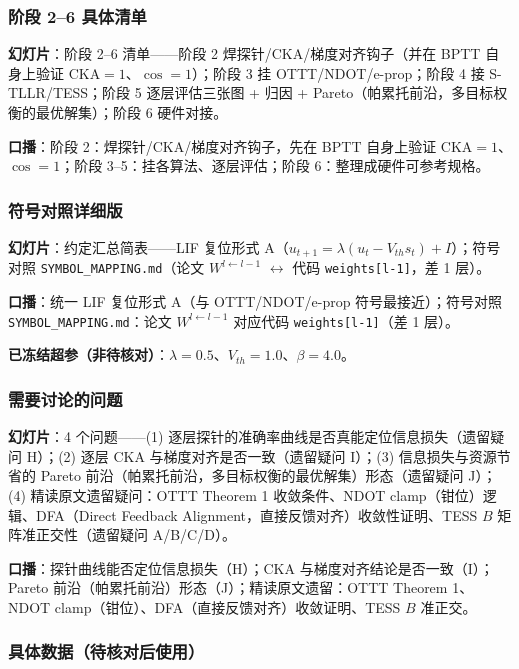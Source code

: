 \documentclass[journal,12pt,onecolumn]{IEEEtran}
\begin{document}
\subsubsection{阶段 2--6 具体清单}

\textbf{幻灯片}：阶段 2--6 清单——阶段 2 焊探针/CKA/梯度对齐钩子（并在 BPTT 自身上验证 $\mathrm{CKA}=1$、$\cos=1$）；阶段 3 挂 OTTT/NDOT/e-prop；阶段 4 接 S-TLLR/TESS；阶段 5 逐层评估三张图 + 归因 + Pareto（帕累托前沿，多目标权衡的最优解集）；阶段 6 硬件对接。

\textbf{口播}：阶段 2：焊探针/CKA/梯度对齐钩子，先在 BPTT 自身上验证 $\mathrm{CKA}=1$、$\cos=1$；阶段 3--5：挂各算法、逐层评估；阶段 6：整理成硬件可参考规格。

\subsubsection{符号对照详细版}

\textbf{幻灯片}：约定汇总简表——LIF 复位形式 A（$u_{t+1}=\lambda(u_t-V_{th}s_t)+I$）；符号对照 \texttt{SYMBOL\_MAPPING.md}（论文 $W^{l\leftarrow l-1}$ $\leftrightarrow$ 代码 \texttt{weights[l-1]}，差 1 层）。

\textbf{口播}：统一 LIF 复位形式 A（与 OTTT/NDOT/e-prop 符号最接近）；符号对照 \texttt{SYMBOL\_MAPPING.md}：论文 $W^{l\leftarrow l-1}$ 对应代码 \texttt{weights[l-1]}（差 1 层）。

\textbf{已冻结超参（非待核对）}：$\lambda=0.5$、$V_{th}=1.0$、$\beta=4.0$。

\subsubsection{需要讨论的问题}

\textbf{幻灯片}：4 个问题——(1) 逐层探针的准确率曲线是否真能定位信息损失（遗留疑问 H）；(2) 逐层 CKA 与梯度对齐是否一致（遗留疑问 I）；(3) 信息损失与资源节省的 Pareto 前沿（帕累托前沿，多目标权衡的最优解集）形态（遗留疑问 J）；(4) 精读原文遗留疑问：OTTT Theorem 1 收敛条件、NDOT clamp（钳位）逻辑、DFA（Direct Feedback Alignment，直接反馈对齐）收敛性证明、TESS $B$ 矩阵准正交性（遗留疑问 A/B/C/D）。

\textbf{口播}：探针曲线能否定位信息损失（H）；CKA 与梯度对齐结论是否一致（I）；Pareto 前沿（帕累托前沿）形态（J）；精读原文遗留：OTTT Theorem 1、NDOT clamp（钳位）、DFA（直接反馈对齐）收敛证明、TESS $B$ 准正交。

\subsubsection{具体数据（待核对后使用）}
\end{document}
